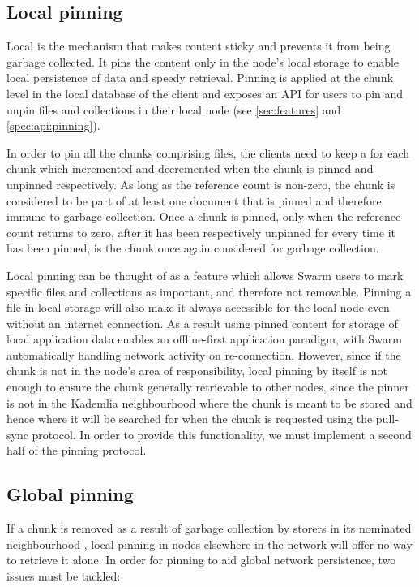 \subsection{Local pinning \statusgreen}\label{sec:pinning}

Local  is the mechanism that makes content sticky and prevents it from being garbage collected. It pins the content only in the node's local storage to enable local persistence of data and speedy retrieval. Pinning is applied at the chunk level in the local database of the client and exposes an API for users to pin and unpin files and collections in their local node (see \ref{sec:features} and \ref{spec:api:pinning}).

In order to pin all the chunks comprising files, the clients need to keep a  for each chunk which incremented and decremented when the chunk is pinned and unpinned respectively. As long as the reference count is non-zero, the chunk is considered to be part of at least one document that is pinned and therefore immune to garbage collection. Once a chunk is pinned, only when the reference count returns to zero, after it has been respectively unpinned for every time it has been pinned, is the chunk once again considered for garbage collection.

Local pinning can be thought of as a feature which allows Swarm users to mark specific files and collections as important, and therefore not removable. Pinning a file in local storage will also make it always accessible for the local node even without an internet connection. As a result using pinned content for storage of local application data enables an offline-first application paradigm, with Swarm automatically handling network activity on re-connection. However, since if the chunk is not in the node's area of responsibility, local pinning by itself is not enough to ensure the chunk generally retrievable to other nodes, since the pinner is not in the Kademlia neighbourhood where the chunk is meant to be stored and hence where it will be searched for when the chunk is requested using the pull-sync protocol. In order to provide this functionality, we must implement a second half of the pinning protocol.

\subsection{Global pinning}\label{sec:global-pinning}

If a chunk is removed as a result of garbage collection by storers in its nominated neighbourhood , local pinning in nodes elsewhere in the network will offer no way to retrieve it alone. In order for pinning to aid global network persistence, two issues must be tackled:

